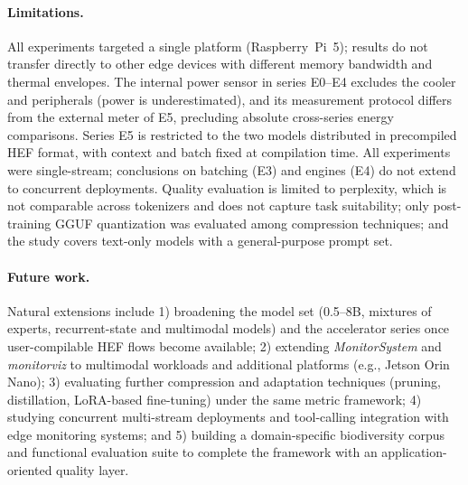 \documentclass[acmsmall,natbib=false]{acmart}
\begin{document}
\paragraph{Limitations.}
All experiments targeted a single platform (Raspberry~Pi~5); results do not
transfer directly to other edge devices with different memory bandwidth and
thermal envelopes. The internal power sensor in series E0--E4 excludes the
cooler and peripherals (power is underestimated), and its measurement protocol differs
from the external meter of E5, precluding absolute cross-series energy
comparisons. Series E5 is restricted to the two models distributed in
precompiled HEF format, with context and batch fixed at compilation time.
All experiments were single-stream; conclusions on batching (E3) and engines
(E4) do not extend to concurrent deployments. Quality evaluation is limited
to perplexity, which is not comparable across tokenizers and does not
capture task suitability; only post-training GGUF quantization was evaluated
among compression techniques; and the study covers text-only models with a
general-purpose prompt set.

\paragraph{Future work.}
Natural extensions include 1) broadening the model set (0.5--8B, mixtures of
experts, recurrent-state and multimodal models) and the accelerator series
once user-compilable HEF flows become available; 2) extending \textit{MonitorSystem} and
\textit{monitorviz} to multimodal workloads and additional platforms (e.g., Jetson
Orin Nano); 3) evaluating further compression and adaptation techniques
(pruning, distillation, LoRA-based fine-tuning) under the same metric
framework; 4) studying concurrent multi-stream deployments and tool-calling
integration with edge monitoring systems; and 5) building a domain-specific
biodiversity corpus and functional evaluation suite to complete the
framework with an application-oriented quality layer.



\printbibliography
\end{document}
